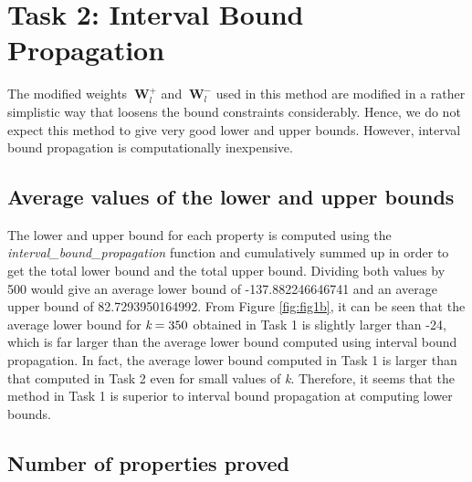 \documentclass[11pt]{article}
\begin{document}
\section{Task 2: Interval Bound Propagation}
\label{sec:Task 2}

The modified weights $\ \textbf{W}_l^+$ and $\ \textbf{W}_l^-$ used in this method are modified in a rather simplistic way that loosens the bound constraints considerably. Hence, we do not expect this method to give very good lower and upper bounds. However, interval bound propagation is computationally inexpensive.

\subsection{Average values of the lower and upper bounds}
\label{sec:221}

The lower and upper bound for each property is computed using the \emph{interval\_bound\_propagation} function and cumulatively summed up in order to get the total lower bound and the total upper bound. Dividing both values by 500 would give an average lower bound of -137.882246646741 and an average upper bound of 82.7293950164992. From Figure \ref{fig:fig1b}, it can be seen that the average lower bound for $\emph{k}=350$ obtained in Task 1 is slightly larger than -24, which is far larger than the average lower bound computed using interval bound propagation. In fact, the average lower bound computed in Task 1 is larger than that computed in Task 2 even for small values of \emph{k}. Therefore, it seems that the method in Task 1 is superior to interval bound propagation at computing lower bounds.



\subsection{Number of properties proved}
\label{sec:222}
\end{document}
